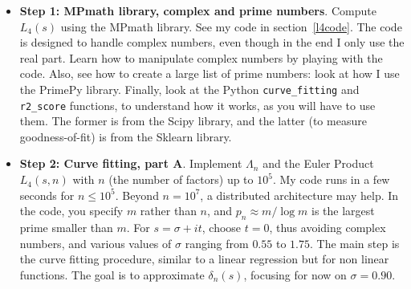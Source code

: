\documentclass[oneside,10pt]{book}
\begin{document}
\begin{itemize}
\item[] {\bf Step 1:  MPmath library, complex and prime numbers}. Compute $L_4(s)$ using the MPmath library. See my code in 
section~\ref{l4code}. The code is designed to handle complex numbers, even though in the end I only use the real part. Learn how to manipulate 
 complex numbers by playing with the code. Also, see how to create a large list of prime numbers: look at how I use the PrimePy library. 
Finally, look at the Python \texttt{curve\_fitting} and \texttt{r2\_score} functions, to understand how it works, as you will have to use them. 
 The former is from the Scipy library, and the latter (to measure \textcolor{index}{goodness-of-fit}) is from the Sklearn library.
\vspace{1ex}
\item[] {\bf Step 2:  Curve fitting, part A}. Implement $\Lambda_n$ and the Euler Product $L_4(s, n)$ with $n$ (the number of factors) up to
 $10^5$.  My code runs in a few seconds for $n\leq 10^5$. Beyond
  $n=10^7$, a distributed architecture may help. In the code, you specify $m$ rather than $n$, and $p_n \approx m/\log m$ is the largest prime smaller than $m$. For $s = \sigma + it$, choose $t=0$, thus avoiding complex numbers, and various values of $\sigma$ ranging from $0.55$ to $1.75$. The main step is the \textcolor{index}{curve fitting} procedure, similar to a linear regression but for non linear functions. 
The goal is to approximate $\delta_n(s)$, focusing for now on $\sigma = 0.90$. \vspace{1ex} 


\end{itemize}
\end{document}
